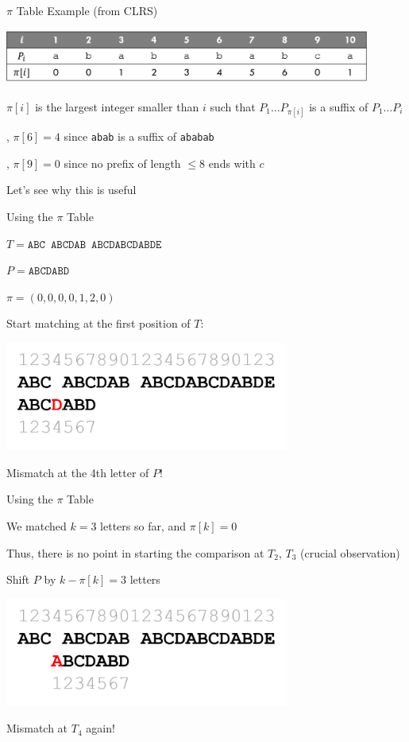 \documentclass[13pt,onlymath]{beamer}
\begin{document}
\begin{frame}{$\pi$ Table Example (from CLRS)}
\begin{center}
\includegraphics[width=0.9\textwidth]{figures/pitable}
\end{center}
\BIT
\item $\pi[i]$ is the largest integer smaller than $i$ such that $P_1 \ldots P_{\pi[i]}$ is a suffix of $P_1 \ldots P_i$
\BIT
\item \eg, $\pi[6]=4$ since \texttt{abab} is a suffix of \texttt{ababab}
\item \eg, $\pi[9]=0$ since no prefix of length $\le 8$ ends with $c$
\EIT
\item Let's see why this is useful
\EIT
\end{frame}

\begin{frame}{Using the $\pi$ Table}
\BIT
\item $T=\mathtt{ABC\:\;ABCDAB\:\;ABCDABCDABDE}$
\item $P=\mathtt{ABCDABD}$
\item $\pi = (0,0,0,0,1,2,0)$
\item Start matching at the first position of $T$:
\begin{center}
\includegraphics[width=0.7\textwidth]{figures/kmp1}
\end{center}
\item Mismatch at the 4th letter of $P$!
\EIT
\end{frame}

\begin{frame}{Using the $\pi$ Table}
\BIT
\item We matched $k=3$ letters so far, and $\pi[k] = 0$
\BIT
\item Thus, there is no point in starting the comparison at $T_2$, $T_3$ (crucial observation)
\EIT
\item Shift $P$ by $k-\pi[k] = 3$ letters
\begin{center}
\includegraphics[width=0.7\textwidth]{figures/kmp2}
\end{center}
\item Mismatch at $T_4$ again!
\EIT
\end{frame}
\end{document}
